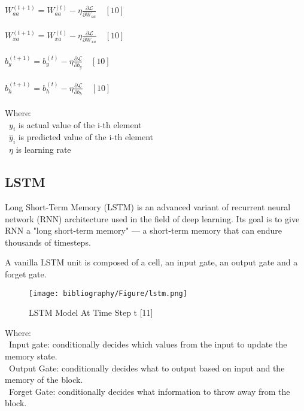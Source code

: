\documentclass{ieeeojies}
\begin{document}
\\$W_{a a}^{(t+1)}=W_{a a}^{(t)}-\eta \frac{\partial \mathcal{L}}{\partial W_{a a}}\quad [10]$\\
\\$W_{x a}^{(t+1)}=W_{x a}^{(t)}-\eta \frac{\partial \mathcal{L}}{\partial W_{x a}}\quad [10]$\\
\\$b_y^{(t+1)}=b_y^{(t)}-\eta \frac{\partial \mathcal{L}}{\partial b_y}\quad [10]$\\
\\$b_h^{(t+1)}=b_h^{(t)}-\eta \frac{\partial \mathcal{L}}{\partial b_h} \quad [10]$\\
\\Where:\\
\indent\textbullet\ $y_i$ is actual value of the i-th element\\
\indent\textbullet\ $\hat{y}_i$ is predicted value of the i-th element\\
\indent\textbullet\ $\eta$ is learning rate \\


\subsection{LSTM}
Long Short-Term Memory (LSTM) is an advanced variant of recurrent neural network (RNN) architecture used in the field of deep learning. Its goal is to give RNN a "long short-term memory" — a short-term memory that can endure thousands of timesteps.

A vanilla LSTM unit is composed of a cell, an input gate, an output gate and a forget gate.

\begin{figure}[H]
  \centering
  \begin{minipage}{0.9\linewidth}
    \centering
    \texttt{[image: bibliography/Figure/lstm.png]}
    \caption{LSTM Model At Time Step t [11]}
    \label{fig9}
  \end{minipage}
\end{figure}

Where:\\
\indent\textbullet\ Input gate: conditionally decides which values from the input to update the memory state.\\
\indent\textbullet\ Output Gate: conditionally decides what to output based on input and the memory of the block.\\
\indent\textbullet\ Forget Gate: conditionally decides what information to throw away from the block.\\
\end{document}
